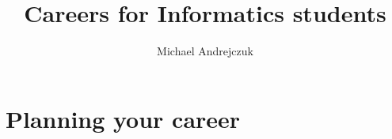 \documentclass[10pt,a4paper,draft]{book}
\author{Michael Andrejczuk}
\title{Careers for Informatics students}
\begin{document}
\maketitle
\tableofcontents
\chapter{Planning your career}








\end{document}
